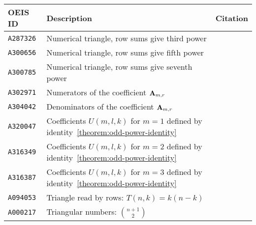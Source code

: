 \begin{center}
    \renewcommand{\arraystretch}{1.3}
    \begin{tabular}{lll}
        \toprule
        \textbf{OEIS ID} & \textbf{Description}                                                                & \textbf{Citation}                                                  \\
        \midrule
        \texttt{A287326} & Numerical triangle, row sums give third power                                       & ~\cite{oeis_numerical_triangle_row_sums_give_cubes}                \\
        \texttt{A300656} & Numerical triangle, row sums give fifth power                                       & ~\cite{oeis_numerical_triangle_row_sums_give_fifth_powers}         \\
        \texttt{A300785} & Numerical triangle, row sums give seventh power                                     & ~\cite{oeis_numerical_triangle_row_sums_give_seventh_powers}       \\
        \texttt{A302971} & Numerators of the coefficient ${\mathbf{A}} \sb{m,r}$                                       & ~\cite{oeis_numerators_of_the_coefficient_a_m_r}                   \\
        \texttt{A304042} & Denominators of the coefficient ${\mathbf{A}} \sb{m,r}$                                     & ~\cite{oeis_denominators_of_the_coefficient_a_m_r}                 \\
        \texttt{A320047} & Coefficients $U(m, l, k)$ for $m = 1$ defined by identity~\eqref{theorem:odd-power-identity} & ~\cite{oeis_coefficients_u_m_l_k_defined_by_polynomial_identity_1} \\
        \texttt{A316349} & Coefficients $U(m, l, k)$ for $m = 2$ defined by identity~\eqref{theorem:odd-power-identity} & ~\cite{oeis_coefficients_u_m_l_k_defined_by_polynomial_identity_2} \\
        \texttt{A316387} & Coefficients $U(m, l, k)$ for $m = 3$ defined by identity~\eqref{theorem:odd-power-identity} & ~\cite{oeis_coefficients_u_m_l_k_defined_by_polynomial_identity_3} \\
        \texttt{A094053} & Triangle read by rows: $T(n, k) = k(n-k) $                                          & ~\cite{zumkeller2004entry}                                         \\
        \texttt{A000217} & Triangular numbers: $\binom{n+1}{2}$                                                & ~\cite{sloane2015triangular}                                       \\
        \bottomrule
    \end{tabular}
\end{center}
